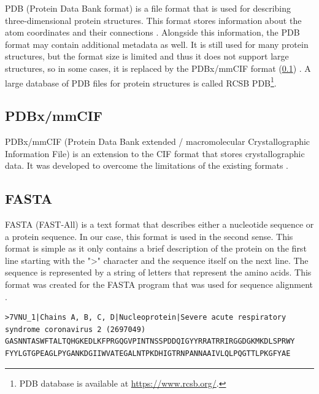 PDB (Protein Data Bank format) is a file format that is used for describing three-dimensional protein structures. This format stores information about the atom coordinates and their connections \cite{bernstein1977protein}. Alongside this information, the PDB format may contain additional metadata as well. It is still used for many protein structures, but the format size is limited and thus it does not support large structures, so in some cases, it is replaced by the PDBx/mmCIF format (\cref{subsec:PDBx_mmCIF}) \cite{adams2019announcing}. A large database of PDB files for protein structures is called RCSB PDB\footnote{PDB database is available at \url{https://www.rcsb.org/}.}.




\subsection{PDBx/mmCIF}
\label{subsec:PDBx_mmCIF}

PDBx/mmCIF (Protein Data Bank extended / macromolecular Crystallographic Information File) is an extension to the CIF format that stores crystallographic data. It was developed to overcome the limitations of the existing formats \cite{bourne199730}.

\subsection{FASTA}
\label{subsec:FASTA}

FASTA (FAST-All) is a text format that describes either a nucleotide sequence or a protein sequence. In our case, this format is used in the second sense. This format is simple as it only contains a brief description of the protein on the first line starting with the ">" character and the sequence itself on the next line. The sequence is represented by a string of letters that represent the amino acids. This format was created for the FASTA program that was used for sequence alignment \cite{lipman1985rapid}.

\begin{lstlisting}[caption={
    An example of a FASTA file used for storing information about the 7VNU sequence.
}, breaklines=true, breakatwhitespace=false,escapechar=*]
>7VNU_1|Chains A, B, C, D|Nucleoprotein|Severe acute respiratory syndrome coronavirus 2 (2697049)
GASNNTASWFTALTQHGKEDLKFPRGQGVPINTNSSPDDQIGYYRRATRRIRGGDGKMKDLSPRWY FYYLGTGPEAGLPYGANKDGIIWVATEGALNTPKDHIGTRNPANNAAIVLQLPQGTTLPKGFYAE
\end{lstlisting}


